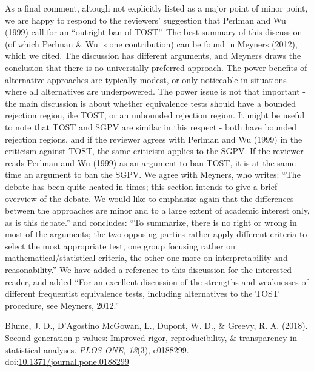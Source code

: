 \documentclass[man]{apa6}
\begin{document}
As a final comment, altough not explicitly listed as a major point of
minor point, we are happy to respond to the reviewers' suggestion that
Perlman and Wu (1999) call for an \enquote{outright ban of TOST}. The
best summary of this discussion (of which Perlman \& Wu is one
contribution) can be found in Meyners (2012), which we cited. The
discussion has different arguments, and Meyners draws the conclusion
that there is no universially preferred approach. The power benefits of
alternative approaches are typically modest, or only noticeable in
situations where all alternatives are underpowered. The power issue is
not that important - the main discussion is about whether equivalence
tests should have a bounded rejection region, ike TOST, or an unbounded
rejection region. It might be useful to note that TOST and SGPV are
similar in this respect - both have bounded rejection regions, and if
the reviewer agrees with Perlman and Wu (1999) in the criticism against
TOST, the same criticism applies to the SGPV. If the reviewer reads
Perlman and Wu (1999) as an argument to ban TOST, it is at the same time
an argument to ban the SGPV. We agree with Meyners, who writes:
\enquote{The debate has been quite heated in times; this section intends
to give a brief overview of the debate. We would like to emphasize again
that the differences between the approaches are minor and to a large
extent of academic interest only, as is this debate.} and concludes:
\enquote{To summarize, there is no right or wrong in most of the
arguments; the two opposing parties rather apply different criteria to
select the most appropriate test, one group focusing rather on
mathematical/statistical criteria, the other one more on
interpretability and reasonability.} We have added a reference to this
discussion for the interested reader, and added \enquote{For an
excellent discussion of the strengths and weaknesses of different
frequentist equivalence tests, including alternatives to the TOST
procedure, see Meyners, 2012.}

\begingroup
\setlength{\parindent}{-0.5in} \setlength{\leftskip}{0.5in}

\hypertarget{refs}{}
\hypertarget{ref-blume_second-generation_2018}{}
Blume, J. D., D'Agostino McGowan, L., Dupont, W. D., \& Greevy, R. A.
(2018). Second-generation p-values: Improved rigor, reproducibility, \&
transparency in statistical analyses. \emph{PLOS ONE}, \emph{13}(3),
e0188299.
doi:\href{https://doi.org/10.1371/journal.pone.0188299}{10.1371/journal.pone.0188299}

\endgroup
\end{document}
